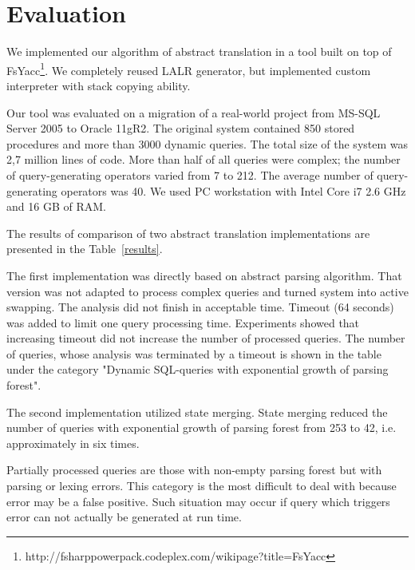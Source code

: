 \section{Evaluation}
\label{sec:Evaluation}

We implemented our algorithm of abstract translation in a tool built on top of 
FsYacc\footnote{http://fsharppowerpack.codeplex.com/wikipage?title=FsYacc}. We completely 
reused LALR generator, but implemented custom interpreter with stack copying ability. 

Our tool was evaluated on a migration of a real-world project from MS-SQL Server 2005 to Oracle 11gR2. 
The original system contained 850 stored procedures and more than 3000 dynamic queries. 
The total size of the system was 2,7 million lines of code. More than half of all queries were 
complex; the number of query-generating operators varied from 7 to 212. The average number of 
query-generating operators was 40. We used PC workstation with Intel Core i7 2.6 GHz and 16 GB of RAM.

The results of comparison of two abstract translation implementations are presented in the Table~\ref{results}.

The first implementation was directly based on abstract parsing algorithm. That version was not adapted 
to process complex queries and turned system into active swapping. The analysis did not finish
in acceptable time. Timeout (64 seconds) was added to limit one query processing time. Experiments 
showed that increasing timeout did not increase the number of processed queries. The number of queries,
whose analysis was terminated by a timeout is shown in the table under the category 
"Dynamic SQL-queries with exponential growth of parsing forest".

The second implementation utilized state merging. State merging reduced the number of queries with 
exponential growth of parsing forest from 253 to 42, i.e. approximately in six times.


Partially processed queries are those with non-empty parsing forest but with parsing or lexing errors. 
This category is the most difficult to deal with because error may be a false positive. Such situation may 
occur if query which triggers error can not actually be generated at run time.

